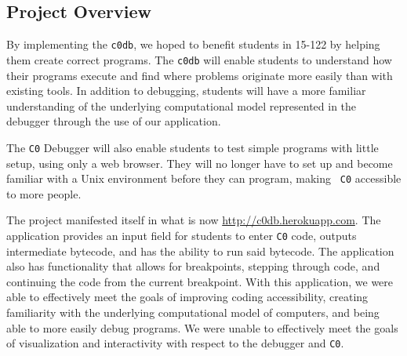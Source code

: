 \documentclass[11pt]{article}
\begin{document}
\subsection{Project Overview}
By implementing the {\tt c0db}, we hoped to benefit students in 15-122 by
helping them create correct programs. The {\tt c0db} will enable students to
understand how their programs execute and find where problems originate more
easily than with existing tools. In addition to debugging, students will have a
more familiar understanding of the underlying computational model represented
in the debugger through the use of our application.
\par
The {\tt C0} Debugger will also enable students to test simple programs with
little setup, using only a web browser. They will no longer have to set up and
become familiar with a Unix environment before they can program, making {\tt
C0} accessible to more people.
\par
The project manifested itself in what is now \url{http://c0db.herokuapp.com}.
The application provides an input field for students to enter {\tt C0} code,
outputs intermediate bytecode, and has the ability to run said bytecode. The
application also has functionality that allows for breakpoints, stepping
through code, and continuing the code from the current breakpoint. With this
application, we were able to effectively meet the goals of improving coding
accessibility, creating familiarity with the underlying computational model of
computers, and being able to more easily debug programs. We were unable to
effectively meet the goals of visualization and interactivity with respect to
the debugger and {\tt C0}.
\end{document}
